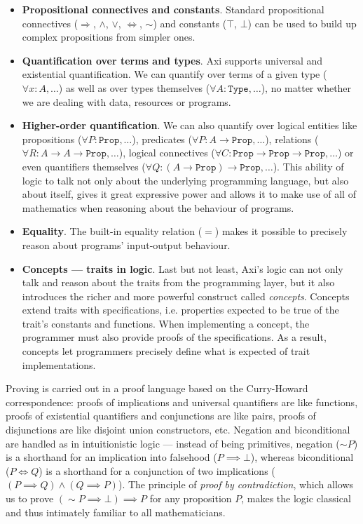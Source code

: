 \begin{itemize}
  \item \textbf{Propositional connectives and constants}. Standard propositional connectives ($\Longrightarrow$, $\land$, $\lor$, $\Longleftrightarrow$, $\sim$) and constants ($\top$, $\bot$) can be used to build up complex propositions from simpler ones.
  \item \textbf{Quantification over terms and types}. Axi supports universal and existential quantification. We can quantify over terms of a given type ($\forall x : A, \dots$) as well as over types themselves ($\forall A : \texttt{Type}, \dots$), no matter whether we are dealing with data, resources or programs.
  \item \textbf{Higher-order quantification}. We can also quantify over logical entities like propositions ($\forall P : \texttt{Prop}, \dots$), predicates ($\forall P : A \rightarrow \texttt{Prop}, \dots$), relations ($\forall R : A \rightarrow A \rightarrow \texttt{Prop}, \dots$), logical connectives ($\forall C : \texttt{Prop} \rightarrow \texttt{Prop} \rightarrow \texttt{Prop}, \dots$) or even quantifiers themselves ($\forall Q : (A \rightarrow \texttt{Prop}) \rightarrow \texttt{Prop}, \dots$). This ability of logic to talk not only about the underlying programming language, but also about itself, gives it great expressive power and allows it to make use of all of mathematics when reasoning about the behaviour of programs.
  \item \textbf{Equality}. The built-in equality relation ($=$) makes it possible to precisely reason about programs' input-output behaviour.
  \item \textbf{Concepts --- traits in logic}. Last but not least, Axi's logic can not only talk and reason about the traits from the programming layer, but it also introduces the richer and more powerful construct called \textit{concepts}. Concepts extend traits with specifications, i.e. properties expected to be true of the trait's constants and functions. When implementing a concept, the programmer must also provide proofs of the specifications. As a result, concepts let programmers precisely define what is expected of trait implementations.
\end{itemize}

Proving is carried out in a proof language based on the Curry-Howard correspondence: proofs of implications and universal quantifiers are like functions, proofs of existential quantifiers and conjunctions are like pairs, proofs of disjunctions are like disjoint union constructors, etc. Negation and biconditional are handled as in intuitionistic logic --- instead of being primitives, negation ($\sim P$) is a shorthand for an implication into falsehood ($P \implies \bot$), whereas biconditional ($P \iff Q$) is a shorthand for a conjunction of two implications ($(P \implies Q) \land (Q \implies P)$). The principle of \textit{proof by contradiction}, which allows us to prove $(\sim P \implies \bot) \implies P$ for any proposition $P$, makes the logic classical and thus intimately familiar to all mathematicians.

